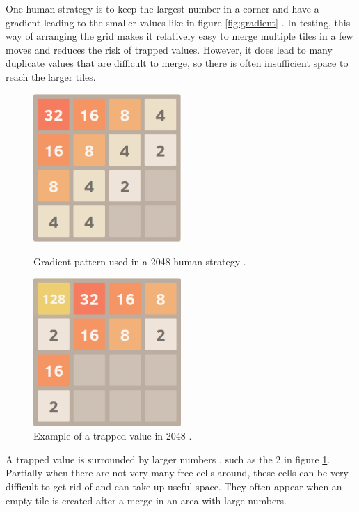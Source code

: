 \documentclass{article}
\begin{document}
One human strategy is to keep the largest number in a corner and have a gradient leading to the smaller values like in figure \ref{fig:gradient} \cite{strategy2048}. In testing, this way of arranging the grid makes it relatively easy to merge multiple tiles in a few moves and reduces the risk of trapped values. However, it does lead to many duplicate values that are difficult to merge, so there is often insufficient space to reach the larger tiles.

\begin{figure}[!tbp]
    \centering
    \begin{minipage}[b]{0.45\textwidth}
        \centering
        \includegraphics[width=0.5\textwidth]{gradient.png}
        \caption{Gradient pattern used in a 2048 human strategy \cite{strategy2048}.}
        \label{fig:gradient}
    \end{minipage}
    \hfill
    \begin{minipage}[b]{0.45\textwidth}
        \centering
        \includegraphics[width=0.5\textwidth]{trapped.png}
        \caption{Example of a trapped value in 2048 \cite{strategy2048}.}
        \label{fig:trap}
    \end{minipage}
\end{figure}
A trapped value is surrounded by larger numbers \cite{strategy2048}, such as the 2 in figure \ref{fig:trap}. Partially when there are not very many free cells around, these cells can be very difficult to get rid of and can take up useful space. They often appear when an empty tile is created after a merge in an area with large numbers. 
\end{document}
